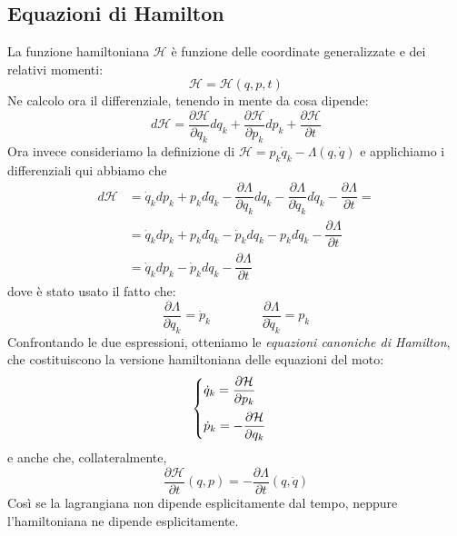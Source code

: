 \documentclass[a4paper,openany]{article}
\begin{document}
	\subsection{Equazioni di Hamilton}
	La funzione hamiltoniana $\mathcal{H}$ è funzione delle coordinate generalizzate e dei relativi momenti:
	$$
	\mathcal{H} = \mathcal{H}(q,p,t)
	$$
	Ne calcolo ora il differenziale, tenendo in mente da cosa dipende:
	\begin{equation}\label{key}
		d\mathcal{H} = \dfrac{\partial \mathcal{H}}{\partial q_k}dq_k +\dfrac{\partial \mathcal{H}}{\partial p_k}dp_k + \dfrac{\partial \mathcal{H}}{\partial t}
	\end{equation}
	Ora invece consideriamo la definizione di $\mathcal{H} = p_k\dot{q}_k  -\Lambda(q,\dot{q})$ e applichiamo i differenziali qui abbiamo che
	\begin{equation}
		\begin{aligned}
			d\mathcal{H} &= \dot{q}_k dp_k + p_k d\dot{q}_k -\dfrac{\partial \Lambda}{\partial q_k}dq_k -\dfrac{\partial \Lambda}{\partial \dot{q}_k}d\dot{q}_k - \dfrac{\partial \Lambda}{\partial t} =\\
			&= \dot{q}_k dp_k + p_k d\dot{q}_k - \dot{p}_k dq_k - p_k d\dot{q}_k - \dfrac{\partial \Lambda}{\partial t} \\
			&= \dot{q}_k dp_k -  \dot{p}_k dq_k - \dfrac{\partial \Lambda}{\partial t} 
		\end{aligned}
	\end{equation}
dove è stato usato il fatto che:
$$
\dfrac{\partial \Lambda}{\partial q_k} = \dot{p}_k   \quad \quad \quad \quad \dfrac{\partial \Lambda}{\partial \dot{q}_k} = p_k
$$
	Confrontando le due espressioni, otteniamo le \textit{equazioni canoniche di Hamilton}, che costituiscono la versione hamiltoniana delle equazioni del moto:
	\begin{equation}\label{key}
		\begin{cases}
			\dot{q}_k = \dfrac{\partial \mathcal{H}}{\partial p_k}\vspace{2mm}   \\
			
			\dot{p}_k = -\dfrac{\partial \mathcal{H}}{\partial q_k}
		\end{cases}
	\end{equation}
	e anche che, collateralmente,
	\begin{equation}\label{key}
		\dfrac{\partial \mathcal{H}}{\partial t}(q,p) = - \dfrac{\partial \Lambda}{\partial t}(q,\dot{q})
	\end{equation}
	Così se la lagrangiana non dipende esplicitamente dal tempo, neppure l'hamiltoniana ne dipende esplicitamente. 
\end{document}
